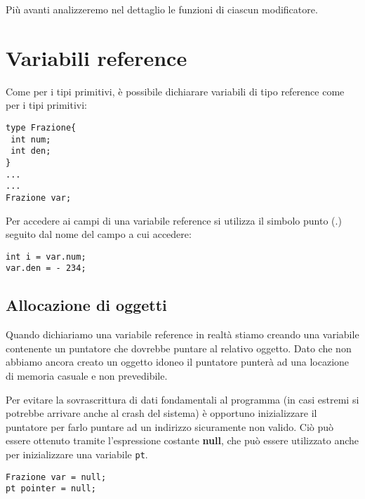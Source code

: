 \documentclass[10pt]{book}%
\newcommand{\e}{\`{e} }
\newcommand{\ac}[1]{\`{#1}}
\newcommand{\code}[1]{\texttt{#1}}
\renewcommand{\emph}[1]{\textbf{#1}}
\newenvironment{codeenv}{
\begin{mdframed}[backgroundcolor=black!20,topline=false,leftline=false,rightline=false,bottomline=false]
}
{\end{mdframed}}
\begin{document}
Pi\ac u avanti analizzeremo nel dettaglio le funzioni di ciascun modificatore.

\section{Variabili reference}
Come per i tipi primitivi, \e possibile dichiarare variabili di tipo reference come per i tipi primitivi:
\begin{codeenv}
\begin{verbatim}
type Frazione{
 int num;
 int den;
}
...
...
Frazione var;
\end{verbatim}
\end{codeenv}
Per accedere ai campi di una variabile reference si utilizza il simbolo punto (.) seguito dal nome del campo a cui accedere:
\begin{codeenv}
\begin{verbatim}
int i = var.num;
var.den = - 234;
\end{verbatim}
\end{codeenv}

\subsection{Allocazione di oggetti}
Quando dichiariamo una variabile reference in realt\ac a stiamo creando una variabile contenente un puntatore che dovrebbe puntare al relativo oggetto. Dato che non abbiamo ancora creato un oggetto idoneo il puntatore punter\ac a ad una locazione di memoria casuale e non prevedibile.

Per evitare la sovrascrittura di dati fondamentali al programma (in casi estremi si potrebbe arrivare anche al crash del sistema) \e opportuno inizializzare il puntatore per farlo puntare ad un indirizzo sicuramente non valido. Ci\ac o pu\ac o essere ottenuto tramite l'espressione costante \emph{null}, che pu\ac o essere utilizzato anche per inizializzare una variabile \code{pt}.
\begin{codeenv}
\begin{verbatim}
Frazione var = null;
pt pointer = null;
\end{verbatim}
\end{codeenv}
\end{document}
